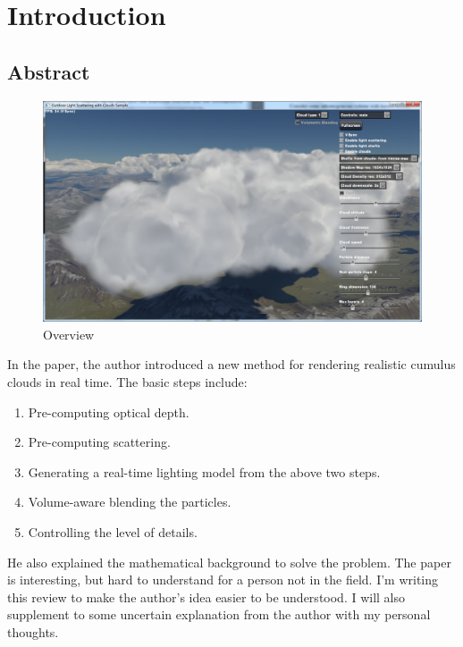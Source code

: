 \chapter{Introduction}

\section{Abstract}
\begin{figure}[htp]
\begin{center}
\includegraphics[scale=0.3]{images/overview.png}
\caption{Overview}
\label{f0}
\end{center}
\end{figure}

In the paper, the author introduced a new method for rendering realistic cumulus clouds in real time. The basic steps include:
\begin{enumerate}
\item Pre-computing optical depth.
\item Pre-computing scattering.
\item Generating a real-time lighting model from the above two steps.
\item Volume-aware blending the particles.
\item Controlling the level of details.
\end{enumerate}
He also explained the mathematical background to solve the problem. The paper is interesting, but hard to understand for a person not in the field. I'm writing this review to make the author's idea easier to be understood. I will also supplement to some uncertain explanation from the author with my personal thoughts.